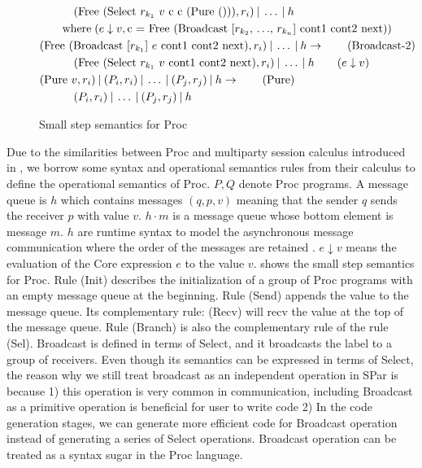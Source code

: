 \begin{figure}[ht]
\begin{align*}
    &\qquad \quad (\text{Free (Select $r_{k_1}$ $v$ c c (Pure ()))}, r_i) \: | \: \ldots \: | \: h \notag\\ 
    & \qquad \text{where} \;(e \downarrow v, \text{c = Free (Broadcast [$r_{k_2}$, $\ldots$, $r_{k_n}$] cont1 cont2 next)}) \notag\\ 
    &(\text{Free (Broadcast [$r_{k_1}$] $e$ cont1 cont2 next)}, r_i) \: | \: \ldots \: | \: h \rightarrow  \tag{Broadcast-2}\\ 
    &\qquad \quad (\text{Free (Select $r_{k_1}$ $v$ cont1 cont2 next)}, r_i) \: | \: \ldots \: | \: h \qquad (e \downarrow v) \notag\\ 
    &(\text{Pure $v$}, r_i) \: | \: (P_i, r_i) \: | \: \ldots \: | \: (P_j, r_j) \: | \: h \rightarrow \tag{Pure}\\
    & \qquad \quad (P_i, r_i) \: | \: \ldots \: | \: (P_j, r_j) \: | \: h \notag\\ 
\end{align*}
\caption{Small step semantics for Proc}
\label{spar:sstep}
\end{figure}
Due to the similarities between Proc and multiparty session calculus introduced in \cite{coppoGentleIntroductionMultiparty2015}, we borrow some syntax and operational semantics rules from their calculus to define the operational semantics of Proc. $P, Q$ denote Proc programs. A message queue is $h$ which contains messages $(q, p, v)$ meaning that the sender $q$ sends the receiver $p$ with value $v$. $h \cdot m$ is a message queue whose bottom element is message $m$. $h$ are runtime syntax to model the asynchronous message communication where the order of the messages are retained \cite{coppoGentleIntroductionMultiparty2015}. $e \downarrow v$ means the evaluation of the Core expression $e$ to the value $v$.  shows the small step semantics for Proc. Rule (Init) describes the initialization of a group of Proc programs with an empty message queue at the beginning. Rule (Send) appends the value to the message queue. Its complementary rule: (Recv) will recv the value at the top of the message queue. Rule (Branch) is also the complementary rule of the rule (Sel). Broadcast is defined in terms of Select, and it broadcasts the label to a group of receivers. Even though its semantics can be expressed in terms of Select, the reason why we still treat broadcast as an independent operation in SPar is because 1) this operation is very common in communication, including Broadcast as a primitive operation is beneficial for user to write code 2) In the code generation stages, we can generate more efficient code for Broadcast operation instead of generating a series of Select operations. Broadcast operation can be treated as a syntax sugar in the Proc language. %

